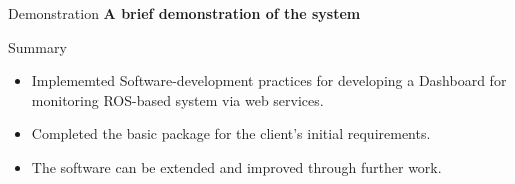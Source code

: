 \documentclass[aspectratio=169]{beamer}
\begin{document}
\begin{frame}{Demonstration}
\vspace*{-15mm}
\center \bf{A brief demonstration of the system}
\end{frame}

\begin{frame}{Summary}
\vspace*{-15mm}
\linespread{2}
	\begin{itemize}
	\item Implememted Software-development practices for developing a Dashboard for monitoring ROS-based system via web services. 
	\item Completed the basic package for the client's initial requirements.
	\item The software can be extended and improved through further work.
	\end{itemize}
\end{frame}
\end{document}

